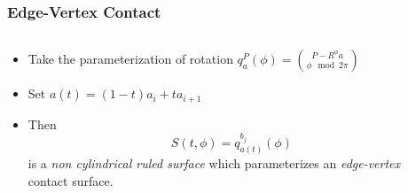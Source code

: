 \documentclass[ucs,9pt,pagenumbersfull]{beamer}
\begin{document}
\begin{frame}
  \frametitle{Edge-Vertex Contact}
  \begin{columns}[c]
    \begin{column}{0.5\textwidth}
      \begin{minipage}[c][\textheight]{\columnwidth}
        \begin{itemize}
        \item<1-> Take the parameterization of rotation \(q^P_a(\phi) = \binom{P-R^{\phi} a}{\phi \mod 2\pi}\)
        \item<2-> Set \(a(t) = (1-t) a_i + t a_{i+1}\)
        \item<3-> Then \[S(t,\phi)  = q ^{b_j}_{a(t)}(\phi)\] is a \emph{non cylindrical ruled surface} which parameterizes an \emph{edge-vertex} contact surface.
        \end{itemize}
      \end{minipage}
    \end{column}
    \begin{column}{0.45\textwidth}
      \begin{minipage}[c][\textheight]{\columnwidth}
        \centering
      \end{minipage}
    \end{column}
  \end{columns}
\end{frame}
\end{document}
